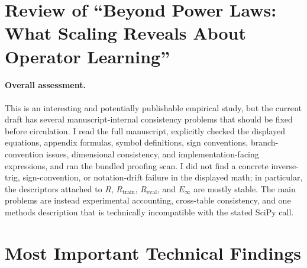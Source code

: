 \documentclass[11pt]{article}
\begin{document}
\section*{Review of ``Beyond Power Laws: What Scaling Reveals About Operator Learning''}

\paragraph{Overall assessment.}
This is an interesting and potentially publishable empirical study, but the current draft has several manuscript-internal consistency problems that should be fixed before circulation. I read the full manuscript, explicitly checked the displayed equations, appendix formulas, symbol definitions, sign conventions, branch-convention issues, dimensional consistency, and implementation-facing expressions, and ran the bundled proofing scan. I did not find a concrete inverse-trig, sign-convention, or notation-drift failure in the displayed math; in particular, the descriptors attached to $R$, $R_{\mathrm{train}}$, $R_{\mathrm{eval}}$, and $E_\infty$ are mostly stable. The main problems are instead experimental accounting, cross-table consistency, and one methods description that is technically incompatible with the stated SciPy call.

\section*{Most Important Technical Findings}
\end{document}
